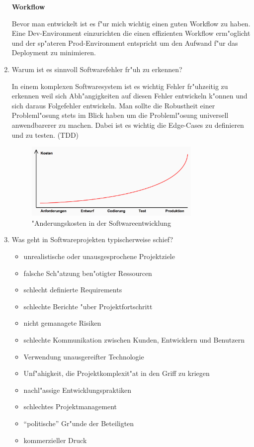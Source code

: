 \begin{enumerate}
\textbf{Workflow}

Bevor man entwickelt ist es f"ur mich wichtig einen guten Workflow zu haben. Eine Dev-Environment einzurichten die einen effizienten Workflow erm"oglicht und der sp"ateren Prod-Environment entspricht um den Aufwand f"ur das Deployment zu minimieren.


\item Warum ist es sinnvoll Softwarefehler fr"uh zu erkennen?
\smallbreak

In einem komplexen Softwaresystem ist es wichtig Fehler fr"uhzeitig zu erkennen weil sich Abh"angigkeiten auf diesen Fehler entwickeln k"onnen und sich daraus Folgefehler entwickeln. Man sollte die Robustheit einer Probleml"osung stets im Blick haben um die Probleml"osung universell anwendbarerer zu machen. Dabei ist es wichtig die Edge-Cases zu definieren und zu testen. (TDD)
\begin{figure}[H]
  \centering
  \includegraphics[width=0.8\textwidth]{./images/Aenderungskosten.png}
  \captionsetup{name=Abb.,font=footnotesize}
  \caption{"Anderungskosten in der Softwareentwicklung}
\end{figure}

\newpage
\item Was geht in Softwareprojekten typischerweise schief?

\begin{itemize}
\item unrealistische oder unausgesprochene Projektziele
\item falsche Sch"atzung ben"otigter Ressourcen
\item schlecht definierte Requirements
\item schlechte Berichte "uber Projektfortschritt
\item nicht gemanagete Risiken
\item schlechte Kommunikation zwischen Kunden, Entwicklern und Benutzern
\item Verwendung unausgereifter Technologie
\item Unf"ahigkeit, die Projektkomplexit"at in den Griff zu kriegen
\item nachl"assige Entwicklungspraktiken
\item schlechtes Projektmanagement
\item ``politische'' Gr"unde der Beteiligten
\item kommerzieller Druck
\end{itemize}



\end{enumerate}
